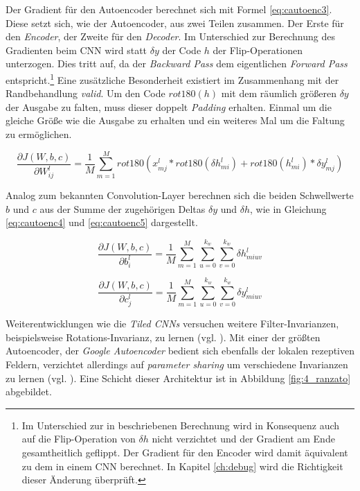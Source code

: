 Der Gradient für den Autoencoder berechnet sich mit Formel \ref{eq:cautoenc3}. Diese setzt sich, wie der Autoencoder, aus zwei Teilen zusammen. Der Erste für den \textit{Encoder}, der Zweite für den \textit{Decoder}. Im Unterschied zur Berechnung des Gradienten beim CNN wird statt $\delta y$ der Code $h$ der Flip-Operationen unterzogen. Dies tritt auf, da der \textit{Backward Pass} dem eigentlichen \textit{Forward Pass} entspricht.\footnote{Im Unterschied zur in \cite{Masci2011} beschriebenen Berechnung wird in Konsequenz auch auf die Flip-Operation von $\delta h$ nicht verzichtet und der Gradient am Ende gesamtheitlich geflippt. Der Gradient für den Encoder wird damit äquivalent zu dem in einem CNN berechnet. In Kapitel \ref{ch:debug} wird die Richtigkeit dieser Änderung überprüft.}
Eine zusätzliche Besonderheit existiert im Zusammenhang mit der Randbehandlung \textit{valid}. Um den Code $rot180(h)$ mit dem räumlich größeren $\delta y$ der Ausgabe zu falten, muss dieser doppelt \textit{Padding}  erhalten. Einmal um die gleiche Größe wie die Ausgabe zu erhalten und ein weiteres Mal um die Faltung zu ermöglichen.

\begin{equation}
\label{eq:cautoenc3} 
\frac{\partial J(W,b,c)}{\partial W_{ij}^l} = \frac{1}{M} \sum_{m=1}^{M} rot180(x_{mj}^l \ast  rot180(\delta h_{mi}^l) + rot180(h_{mi}^l) \ast \delta y_{mj}^l)   
\end{equation}

Analog zum bekannten Convolution-Layer berechnen sich die beiden Schwellwerte $b$ und $c$ aus der Summe der zugehörigen Deltas $\delta y$ und $\delta h$, wie in Gleichung \ref{eq:cautoenc4} und \ref{eq:cautoenc5} dargestellt.

\begin{equation}
\label{eq:cautoenc4} 
\frac{\partial J(W,b,c)}{\partial b_{i}^l} = \frac{1}{M} \sum_{m=1}^{M} \sum_{u=0}^{k_w} \sum_{v=0}^{k_w} \delta h_{miuv}^{l} 
\end{equation}


\begin{equation}
\label{eq:cautoenc5} 
\frac{\partial J(W,b,c)}{\partial c_{j}^l} = \frac{1}{M} \sum_{m=1}^{M} \sum_{u=0}^{k_w} \sum_{v=0}^{k_w} \delta y_{miuv}^{l} 
\end{equation}


Weiterentwicklungen wie die \textit{Tiled CNNs} versuchen weitere Filter-Invarianzen, beispielsweise Rotations-Invarianz, zu lernen (vgl. \cite{Quoc2010}).
Mit einer der größten Autoencoder, der \textit{Google Autoencoder} bedient sich ebenfalls der lokalen rezeptiven Feldern, verzichtet allerdings auf \textit{parameter sharing} um verschiedene Invarianzen zu lernen (vgl. \cite{LeRanzato2012}). Eine Schicht dieser Architektur ist in Abbildung \ref{fig:4_ranzato} abgebildet.

